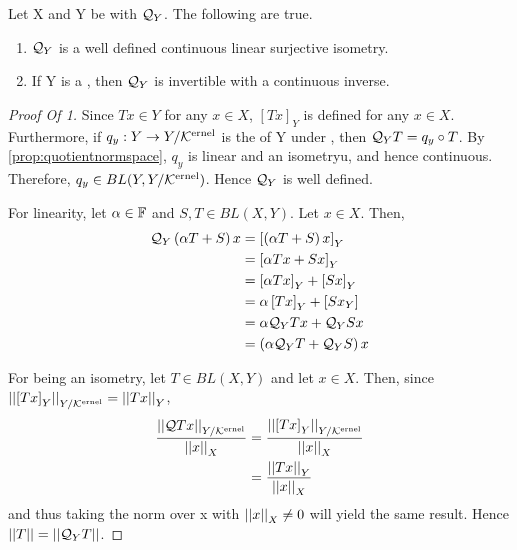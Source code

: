 \begin{prop}
\label{prop:handedquotientoperators}
    Let X and Y be 
    \SeminormedSpaces
    with \CodomainQuotientMap $\mathcal{Q}_Y$. 
    The following are true. 
    \begin{enumerate}
        \item $\mathcal{Q}_Y$ is a well defined continuous linear surjective isometry. 
        \item If Y is a \NormedSpace, then $\mathcal{Q}_Y$ is invertible with a continuous inverse. 
    \end{enumerate}
    \begin{proof}[Proof Of 1]
        Since $Tx \in Y$ for any $x \in X$, 
        $[Tx]_Y$ is defined for any $x \in X$. 
        Furthermore, if $q_y:Y \to Y/\bf\mathcal{K}\rm^{ernel}$
        is the \QuotientMap of Y under 
        \EquivalenceModKernel, then 
        $\mathcal{Q}_YT = q_y \circ T$. 
        By \ref{prop:quotientnormspace}, 
        $q_y$ is linear and an isometryu, and hence continuous.
        Therefore, 
        $q_y \in BL(Y, Y/\bf\mathcal{K}\rm^{ernel})$. 
        Hence $\mathcal{Q}_Y$ is well defined. 

        For linearity, let $\alpha \in \mathbb{F}$
        and $S,T \in BL(X,Y)$. 
        Let $x \in X$. 
        Then, 
        \begin{align*}
            \mathcal{Q}_Y\left( \alpha T+S\right)x & = \left[ \left( \alpha T+S\right)x \right]_Y\\
            & = \left[ \alpha Tx+ Sx \right]_Y\\
            & = \left[ \alpha Tx \right]_Y+ \left[ Sx \right]_Y\\
            & = \alpha \left[ Tx \right]_Y+\left[ Sx_Y \right]\\
            & = \alpha \mathcal{Q}_YTx+ \mathcal{Q}_YSx\\
            & = \left( \alpha \mathcal{Q}_YT+\mathcal{Q}_YS\right)x
        \end{align*}

        For being an isometry, 
        let $T \in BL(X,Y)$ and 
        let $x \in X$. Then, since $\left|\left| \left[ Tx \right]_Y \right|\right|_{Y/\bf\mathcal{K}\rm^{ernel}} = \left|\left| Tx \right|\right|_Y$, 
        \begin{align*}
            \frac{\left|\left| \mathcal{Q} Tx \right|\right|_{Y/\bf\mathcal{K}\rm^{ernel}}}{\left|\left| x \right|\right|_X} & = \frac{\left|\left| \left[ Tx \right]_Y \right|\right|_{Y/\bf\mathcal{K}\rm^{ernel}}}{\left|\left| x \right|\right|_X} \\
            & = \frac{\left|\left| Tx \right|\right|_Y}{\left|\left| x \right|\right|_X} 
        \end{align*}
        and thus taking the norm over
        x with $\left|\left| x \right|\right|_X \neq 0$ will yield the
        same result. Hence $\left|\left| T \right|\right| = \left|\left| \mathcal{Q}_Y T \right|\right|$. 


\end{proof}
\end{prop}
